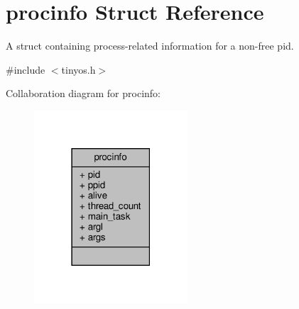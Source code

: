 \hypertarget{structprocinfo}{}\section{procinfo Struct Reference}
\label{structprocinfo}


A struct containing process-\/related information for a non-\/free pid.  




{\ttfamily \#include $<$tinyos.\+h$>$}



Collaboration diagram for procinfo\+:
\nopagebreak
\begin{figure}[H]
\begin{center}
\leavevmode
\includegraphics[width=162pt]{structprocinfo__coll__graph}
\end{center}
\end{figure}
